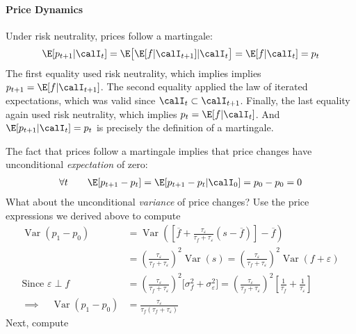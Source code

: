 \documentclass[12pt]{article}
\theoremstyle{plain}
\theoremstyle{definition}
\theoremstyle{remark}
\newcommand{\Var}{\operatorname{Var}}
\begin{document}
\paragraph{Price Dynamics}
Under risk neutrality, prices follow a martingale:
\begin{align*}
  \E[p_{t+1}|\calI_t]
  = \E\big[\E[f|\calI_{t+1}]|\calI_t\big]
  = \E[f|\calI_t]
  = p_t
\end{align*}
The first equality used risk neutrality, which implies implies
$p_{t+1}=\E[f|\calI_{t+1}]$.  The second equality applied the law of
iterated expectations, which was valid since $\calI_t\subset
\calI_{t+1}$.  Finally, the last equality again used risk neutrality,
which implies $p_{t}=\E[f|\calI_{t}]$.
And $\E[p_{t+1}|\calI_t]=p_t$ is precisely the definition of a
martingale.

The fact that prices follow a martingale implies that price changes have
unconditional \emph{expectation} of zero:
\begin{align*}
  \forall t
  \qquad
  \E[p_{t+1}-p_t]
  =
  \E[p_{t+1}-p_t|\calI_0]
  =
  p_0 - p_0
  = 0
\end{align*}
What about the unconditional \emph{variance} of price changes?
Use the price expressions we derived above to compute
\begin{align*}
  \Var(p_1-p_0)
  &=
  \Var\left(
  \left[
  \overline{f}
  + \frac{\tau_\varepsilon}{\tau_f+\tau_\varepsilon}
  (s-\overline{f})
  \right]
  -\overline{f}
  \right)
  \\
  &=
  \left(
  \frac{\tau_\varepsilon}{\tau_f+\tau_\varepsilon}
  \right)^2
  \Var(s)
  =
  \left(
  \frac{\tau_\varepsilon}{\tau_f+\tau_\varepsilon}
  \right)^2
  \Var(f+\varepsilon)
  \\
  \text{Since $\varepsilon\perp f$}\qquad
  &=
  \left(
  \frac{\tau_\varepsilon}{\tau_f+\tau_\varepsilon}
  \right)^2
  \big[
    \sigma^2_f
    +
    \sigma^2_\varepsilon
  \big]
  =
  \left(
  \frac{\tau_\varepsilon}{\tau_f+\tau_\varepsilon}
  \right)^2
  \left[
    \frac{1}{\tau_f}
    +
    \frac{1}{\tau_\varepsilon}
  \right]
  \\
  \implies\quad
  \Var(p_1-p_0)
  &=
  \frac{\tau_\varepsilon}{\tau_f(\tau_f+\tau_\varepsilon)}
\end{align*}
Next, compute
\end{document}
